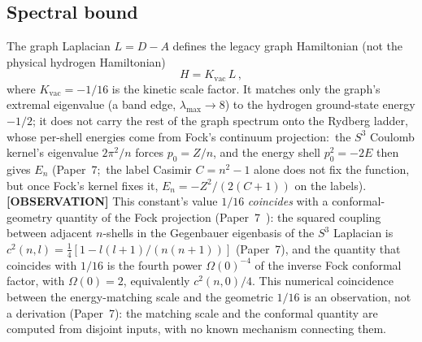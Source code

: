 \documentclass[aps,prl,reprint,amsmath,amssymb]{revtex4-2}
\begin{document}
\subsection{Spectral bound}

The graph Laplacian $L = D - A$ defines the legacy graph Hamiltonian
(not the physical hydrogen Hamiltonian)
\begin{equation}
  H = K_{\mathrm{vac}} \, L \,,
  \label{eq:graph-hamiltonian}
\end{equation}
where $K_{\mathrm{vac}} = -1/16$ is the kinetic scale factor.  It
matches only the graph's extremal eigenvalue (a band edge,
$\lambda_{\max} \to 8$) to the hydrogen ground-state energy $-1/2$;
it does not carry the rest of the graph spectrum onto the Rydberg
ladder, whose per-shell energies come from Fock's continuum
projection:\ the $S^3$ Coulomb kernel's eigenvalue $2\pi^2/n$ forces
$p_0 = Z/n$, and the energy shell $p_0^2 = -2E$ then gives $E_n$
(Paper~7;\ the label Casimir $C = n^2-1$ alone does not fix the function,
but once Fock's kernel fixes it, $E_n = -Z^2/(2(C+1))$ on the labels).  \textbf{[OBSERVATION]} This constant's value $1/16$ \emph{coincides} with a conformal-geometry
quantity of the Fock projection (Paper~7~\cite{paper7}): the squared
coupling between adjacent $n$-shells in the Gegenbauer eigenbasis of the
$S^3$ Laplacian is $c^2(n,l) = \tfrac{1}{4}[1 - l(l+1)/(n(n+1))]$ (Paper~7), and the quantity
that coincides with $1/16$ is the fourth power $\Omega(0)^{-4}$ of the inverse
Fock conformal factor, with $\Omega(0) = 2$, equivalently $c^2(n,0)/4$.  This numerical coincidence
between the energy-matching scale and the geometric $1/16$ is an
observation, not a derivation (Paper~7): the matching scale and the
conformal quantity are computed from disjoint inputs, with no known
mechanism connecting them.
\end{document}
